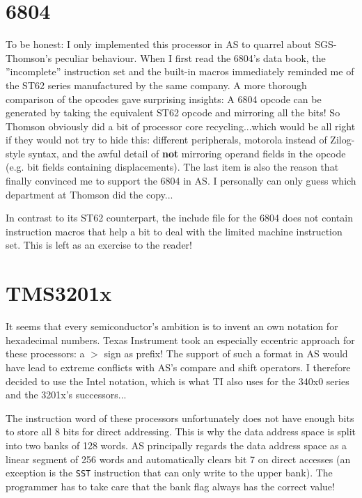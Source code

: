 \documentclass[12pt,twoside]{report}
\newcommand{\bb}[1]{{\bf #1}}
\newcommand{\tty}[1]{{\tt #1}}
\newcommand{\asname}{{AS}}
\begin{document}
\section{6804}

To be honest: I only implemented this processor in \asname{} to quarrel
about SGS-Thomson's peculiar behaviour.  When I first read the 6804's
data book, the ''incomplete'' instruction set and the built-in macros
immediately reminded me of the ST62 series manufactured by the same
company.  A more thorough comparison of the opcodes gave surprising
insights: A 6804 opcode can be generated by taking the equivalent
ST62 opcode and mirroring all the bits!  So Thomson obviously did a
bit of processor core recycling...which would be all right if they
would not try to hide this:  different peripherals, motorola instead
of Zilog-style syntax, and the awful detail of \bb{not} mirroring operand
fields in the opcode (e.g. bit fields containing displacements).  The
last item is also the reason that finally convinced me to support the
6804 in \asname{}.  I personally can only guess which department at Thomson
did the copy...

In contrast to its ST62 counterpart, the include file for the 6804
does not contain instruction macros that help a bit to deal with the
limited machine instruction set.  This is left as an exercise to the
reader!


\section{TMS3201x}

It seems that every semiconductor's ambition is to invent an own
notation for hexadecimal numbers.  Texas Instrument took an
especially eccentric approach for these processors: a $>$ sign as
prefix!  The support of such a format in \asname{} would have lead to
extreme conflicts with \asname{}'s compare and shift operators.  I therefore
decided to use the Intel notation, which is what TI also uses for the
340x0 series and the 3201x's successors...

The instruction word of these processors unfortunately does not have
enough bits to store all 8 bits for direct addressing.  This is why
the data address space is split into two banks of 128 words.  \asname{}
principally regards the data address space as a linear segment of 256
words and automatically clears bit 7 on direct accesses (an exception
is the \tty{SST} instruction that can only write to the upper bank).  The
programmer has to take care that the bank flag always has the correct
value!
\end{document}
